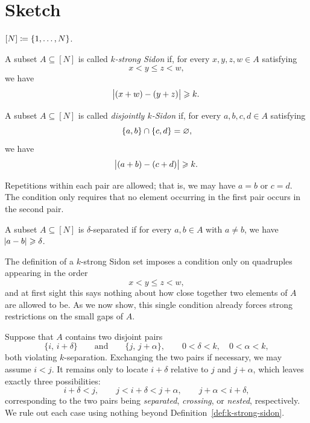 \documentclass[reqno,a4paper,12pt]{amsart}
\begin{document}

\section{Sketch}

$[N] \mathrel{\coloneqq} \lbrace1, \dotsc, N\rbrace$.

\begin{definition}
    \label{def:k-strong-sidon}
    A subset $A\subseteq[N]$ is called \emph{$k$-strong Sidon} if, for
    every $x,y,z,w\in A$ satisfying
    \[
        x<y\leq z<w,
    \]
    we have
    \[
        \abs{(x+w)-(y+z)}\geqslant k.
    \]
\end{definition}

\begin{definition}
    \label{def:disjoint-disjointly disjointly $k$-Sidon}
    A subset $A\subseteq[N]$ is called \emph{disjointly $k$-Sidon} if,
    for every $a,b,c,d\in A$ satisfying
    \[
        \lbrace a,b\rbrace\cap\lbrace c,d\rbrace=\varnothing,
    \]
    we have
    \[
        \abs{(a+b)-(c+d)}\geqslant k.
    \]

    Repetitions within each pair are allowed; that is, we may have
    $a=b$ or $c=d$. The condition only requires that no element occurring
    in the first pair occurs in the second pair.
\end{definition}

\begin{definition}
    A subset $A \subseteq [N]$ is $\delta$-separated if for every $a,b \in A$ with $a \neq b$, we have $\abs{a - b} \geqslant \delta$.
\end{definition}

The definition of a \(k\)-strong Sidon set imposes a condition only on
quadruples appearing in the order
\[
    x<y\leq z<w,
\]
and at first sight this says nothing about how close together two
elements of \(A\) are allowed to be. As we now show, this single
condition already forces strong restrictions on the small gaps of
\(A\).

Suppose that \(A\) contains two disjoint pairs
\[
    \{i,\,i+\delta\}
    \qquad\text{and}\qquad
    \{j,\,j+\alpha\},
    \qquad
    0<\delta<k,
    \quad
    0<\alpha<k,
\]
both violating \(k\)-separation. Exchanging the two pairs if
necessary, we may assume \(i<j\). It remains only to locate
\(i+\delta\) relative to \(j\) and \(j+\alpha\), which leaves exactly
three possibilities:
\[
    i+\delta<j,
    \qquad
    j<i+\delta<j+\alpha,
    \qquad
    j+\alpha<i+\delta,
\]
corresponding to the two pairs being \emph{separated}, \emph{crossing},
or \emph{nested}, respectively. We rule out each case using nothing
beyond Definition~\ref{def:k-strong-sidon}.
\end{document}
